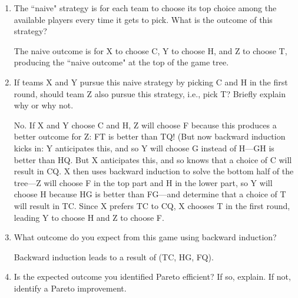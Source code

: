 \documentclass[twoside]{article}
\begin{document}
    \begin{enumerate}
    \item \begin{EXAM} The ``naive" strategy is for each team to choose its top choice among the available players every time it gets to pick. What is the outcome of this strategy? \end{EXAM}%

\begin{KEY}
The naive outcome is for X to choose C, Y to choose H, and Z to choose T, producing the ``naive outcome" at the top of the game tree.
\end{KEY}

    \item \begin{EXAM} If teams X and Y pursue this naive strategy by picking C and H in the first round, should team Z also pursue this strategy, i.e., pick T? %
Briefly explain why or why not.\end{EXAM}

\begin{KEY}
No. If X and Y choose C and H, Z will choose F because this produces a better outcome for Z: FT is better than TQ! (But now backward induction kicks in: Y anticipates this, and so Y will choose G instead of  H---GH is better than HQ. But X anticipates this, and so knows that a choice of C will result in CQ. X then uses backward induction to solve the bottom half of the tree---Z will choose F in the top part and H in the lower part, so Y will choose H because HG is better than FG---and determine that a choice of T will result in TC. Since X prefers TC to CQ, X chooses T in the first round, leading Y to choose H and Z to choose F.
\end{KEY}

    \item \begin{EXAM} What outcome do you expect from this game using backward induction? \end{EXAM} %

\begin{KEY}
Backward induction leads to a result of (TC, HG, FQ).
\end{KEY}

    \item \begin{EXAM} Is the expected outcome you identified Pareto efficient? If so, explain. If not, identify a Pareto improvement.\end{EXAM}


\end{enumerate}
\end{document}
